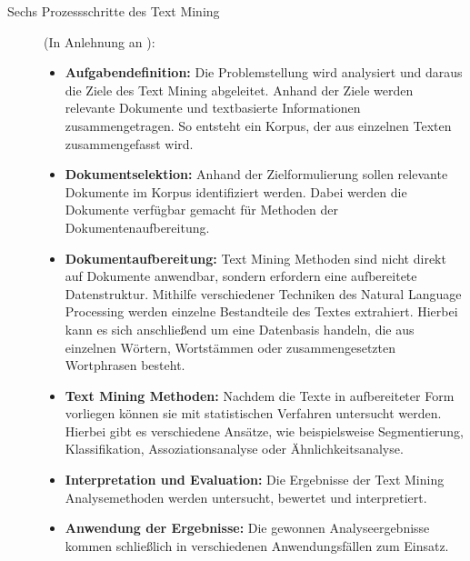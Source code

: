 \documentclass[
        ngerman,
        paper=a4,
        numbers=noendperiod,
]{scrreprt}
\begin{document}
\begin{description}
\item[Sechs Prozessschritte des Text Mining] (In Anlehnung an \cite [S. 288]{eff70}):
\begin{itemize}
\item \textbf{Aufgabendefinition:} Die Problemstellung wird analysiert und daraus die Ziele des Text Mining abgeleitet.\cite{Dwivedi2013ResearchSystem} Anhand der Ziele werden relevante Dokumente und textbasierte Informationen zusammengetragen. So entsteht ein Korpus, der aus einzelnen Texten zusammengefasst wird.
\item \textbf{Dokumentselektion:} Anhand der Zielformulierung sollen relevante Dokumente im Korpus identifiziert werden. Dabei werden die Dokumente verfügbar gemacht für Methoden der Dokumentenaufbereitung.
\item \textbf{Dokumentaufbereitung:} Text Mining Methoden sind nicht direkt auf Dokumente anwendbar, sondern erfordern eine aufbereitete Datenstruktur. Mithilfe verschiedener Techniken des Natural Language Processing werden einzelne Bestandteile des Textes extrahiert. Hierbei kann es sich anschließend um eine Datenbasis handeln, die aus einzelnen Wörtern, Wortstämmen oder zusammengesetzten Wortphrasen besteht.
\item \textbf{Text Mining Methoden:} Nachdem die Texte in aufbereiteter Form vorliegen können sie mit statistischen Verfahren untersucht werden. Hierbei gibt es verschiedene Ansätze, wie beispielsweise Segmentierung, Klassifikation, Assoziationsanalyse oder Ähnlichkeitsanalyse.
\item \textbf{Interpretation und Evaluation:} Die Ergebnisse der Text Mining Analysemethoden werden untersucht, bewertet und interpretiert.
\item \textbf{Anwendung der Ergebnisse:} Die gewonnen Analyseergebnisse kommen schließlich in verschiedenen Anwendungsfällen zum Einsatz.
\end{itemize} 
\end{description}
\end{document}
